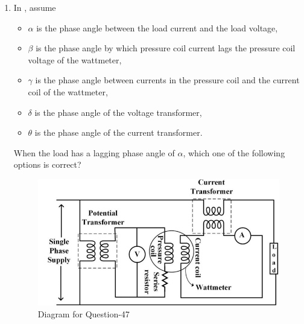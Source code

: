 \documentclass[journal,12pt,onecolumn]{IEEEtran}
\theoremstyle{remark}
\begin{document}
\begin{enumerate}
\item In , assume  
\begin{itemize}
    \item $\alpha$ is the phase angle between the load current and the load voltage,
    \item $\beta$ is the phase angle by which pressure coil current lags the pressure coil voltage of the wattmeter,
    \item $\gamma$ is the phase angle between currents in the pressure coil and the current coil of the wattmeter,
    \item $\delta$ is the phase angle of the voltage transformer,
    \item $\theta$ is the phase angle of the current transformer.
\end{itemize}
When the load has a lagging phase angle of $\alpha$, which one of the following options is correct?
\par\hfill{}
\begin{figure}[H]
    \centering
    \includegraphics[width=0.5\columnwidth]{Figs/Q-47.png}
    \caption{Diagram for Question-47}
    \label{47}
\end{figure}
    \begin{enumerate}
    \end{enumerate}


\end{enumerate}
\end{document}
